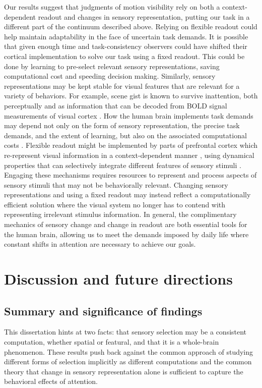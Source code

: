 \documentclass{report}
\begin{document}
Our results suggest that judgments of motion visibility rely on both a context-dependent readout and changes in sensory representation, putting our task in a different part of the continuum described above. Relying on flexible readout could help maintain adaptability in the face of uncertain task demands. It is possible that given enough time and task-consistency observers could have shifted their cortical implementation to solve our task using a fixed readout. This could be done by learning to pre-select relevant sensory representations, saving computational cost and speeding decision making. Similarly, sensory representations may be kept stable for visual features that are relevant for a variety of behaviors. For example, scene gist is known to survive inattention, both perceptually \citep{Li2002-ji} and as information that can be decoded from BOLD signal measurements of visual cortex \citep{Peelen2009-us}. 
How the human brain implements task demands may depend not only on the form of sensory representation, the precise task demands, and the extent of learning, but also on the associated computational costs \citep{Gardner2019-ky}. Flexible readout might be implemented by parts of prefrontal cortex which re-represent visual information in a context-dependent manner \citep{Bugatus2017-wl}, using dynamical properties that can selectively integrate different features of sensory stimuli \citep{Mante2013-tn}. Engaging these mechanisms requires resources to represent and process aspects of sensory stimuli that may not be behaviorally relevant. Changing sensory representations and using a fixed readout may instead reflect a computationally efficient solution where the visual system no longer has to contend with representing irrelevant stimulus information. In general, the complimentary mechanics of sensory change and change in readout are both essential tools for the human brain, allowing us to meet the demands imposed by daily life where constant shifts in attention are necessary to achieve our goals.

\chapter[Discussion]{Discussion and future directions}

\section{Summary and significance of findings}

This dissertation hints at two facts: that sensory selection may be a consistent computation, whether spatial or featural, and that it is a whole-brain phenomenon. These results push back against the common approach of studying different forms of selection implicitly as different computations and the common theory that change in sensory representation alone is sufficient to capture the behavioral effects of attention. 
\end{document}
